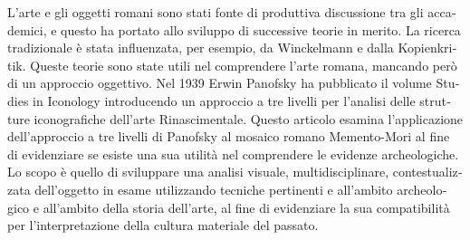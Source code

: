 	\begin{myabstract}
		\foreignlanguage{italian}{%
			L'arte e gli oggetti romani sono stati fonte di produttiva discussione tra gli accademici, e questo ha portato allo sviluppo di successive teorie in merito. La ricerca tradizionale è stata influenzata, per esempio, da Winckelmann e dalla Kopienkritik. Queste teorie sono state utili nel comprendere l'arte romana, mancando però di un approccio oggettivo. Nel 1939 Erwin Panofsky ha pubblicato il volume Studies in Iconology introducendo un approccio a tre livelli per l'analisi delle strutture iconografiche dell'arte Rinascimentale. Questo articolo esamina l'applicazione dell'approccio a tre livelli di Panofsky al mosaico romano Memento-Mori al fine di evidenziare se esiste una sua utilità nel comprendere le evidenze archeologiche. Lo scopo è quello di sviluppare una analisi visuale, multidisciplinare, contestualizzata dell'oggetto in esame utilizzando tecniche pertinenti e all'ambito archeologico e all'ambito della storia dell'arte, al fine di evidenziare la sua compatibilità per l'interpretazione della cultura materiale del passato.}
	\end{myabstract}
		

\printbibliography[heading=subbibnumbered] 
\label{heekeren:lastpage}
\closingarticle